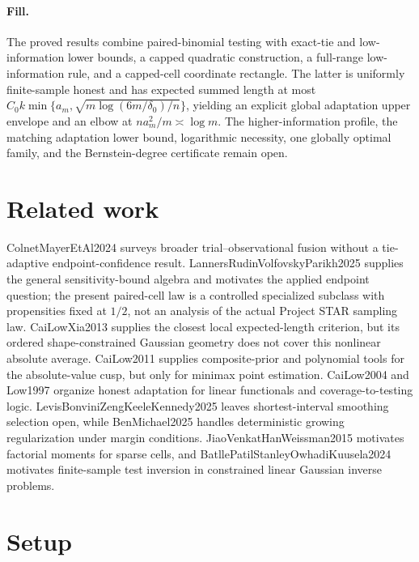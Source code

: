 \documentclass{article}
\begin{document}
\paragraph{Fill.} The proved results combine paired-binomial testing with exact-tie and low-information lower bounds, a capped quadratic construction, a full-range low-information rule, and a capped-cell coordinate rectangle. The latter is uniformly finite-sample honest and has expected summed length at most \(C_0k\min\{a_m,\sqrt{m\log(6m/\delta_0)/n}\}\), yielding an explicit global adaptation upper envelope and an elbow at \(na_m^2/m\asymp\log m\). The higher-information profile, the matching adaptation lower bound, logarithmic necessity, one globally optimal family, and the Bernstein-degree certificate remain open.

\section{Related work}

ColnetMayerEtAl2024 surveys broader trial--observational fusion without a tie-adaptive endpoint-confidence result. LannersRudinVolfovskyParikh2025 supplies the general sensitivity-bound algebra and motivates the applied endpoint question; the present paired-cell law is a controlled specialized subclass with propensities fixed at \(1/2\), not an analysis of the actual Project STAR sampling law. CaiLowXia2013 supplies the closest local expected-length criterion, but its ordered shape-constrained Gaussian geometry does not cover this nonlinear absolute average. CaiLow2011 supplies composite-prior and polynomial tools for the absolute-value cusp, but only for minimax point estimation. CaiLow2004 and Low1997 organize honest adaptation for linear functionals and coverage-to-testing logic. LevisBonviniZengKeeleKennedy2025 leaves shortest-interval smoothing selection open, while BenMichael2025 handles deterministic growing regularization under margin conditions. JiaoVenkatHanWeissman2015 motivates factorial moments for sparse cells, and BatllePatilStanleyOwhadiKuusela2024 motivates finite-sample test inversion in constrained linear Gaussian inverse problems.

\section{Setup}
\end{document}
